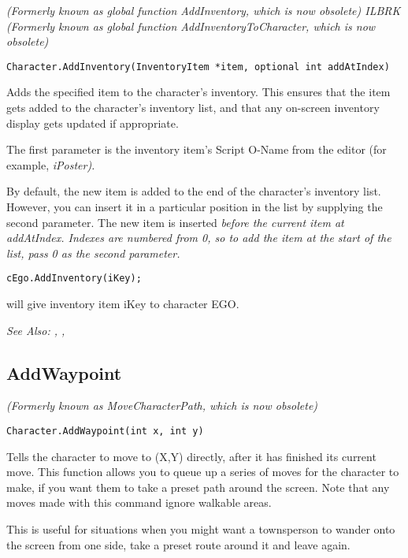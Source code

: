 \it{(Formerly known as global function AddInventory, which is now obsolete)} ILBRK
\it{(Formerly known as global function AddInventoryToCharacter, which is now obsolete)}

\begin{verbatim}
Character.AddInventory(InventoryItem *item, optional int addAtIndex)
\end{verbatim}
Adds the specified item to the character's inventory. This
ensures that the item gets added to the character's inventory list, and that
any on-screen inventory display gets updated if appropriate.

The first parameter is the inventory item's Script O-Name from the editor (for
example, \it{iPoster}).

By default, the new item is added to the end of the character's inventory list. However,
you can insert it in a particular position in the list by supplying the second parameter.
The new item is inserted \it{before} the current item at \it{addAtIndex}. Indexes are
numbered from 0, so to add the item at the start of the list, pass 0 as the second parameter.

\begin{verbatim}
cEgo.AddInventory(iKey);
\end{verbatim}
will give inventory item iKey to character EGO.

\it{See Also:} ,
,


\subsection{AddWaypoint}\label{Character.AddWaypoint}%

\it{(Formerly known as MoveCharacterPath, which is now obsolete)}

\begin{verbatim}
Character.AddWaypoint(int x, int y)
\end{verbatim}
Tells the character to move to (X,Y) directly, after it has finished its current
move. This function allows you to queue up a series of moves for the character to make, if
you want them to take a preset path around the screen. Note that any moves made with
this command ignore walkable areas.

This is useful for situations when you might want a townsperson to wander onto the screen
from one side, take a preset route around it and leave again.

